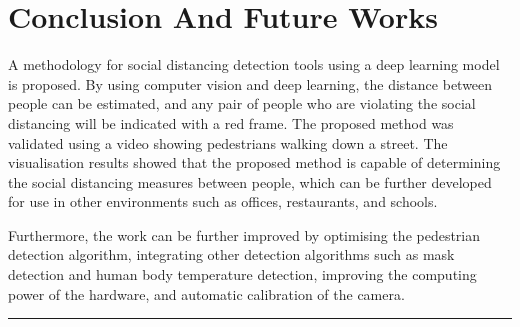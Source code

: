 \documentclass[conference]{IEEEtran}
\begin{document}
\section{Conclusion And Future Works}
A methodology for social distancing detection tools using a deep learning model is proposed. By using computer vision and deep learning, the distance between people can be estimated, and any pair of people who are violating the social distancing will be indicated with a red frame. The proposed method was validated using a video showing pedestrians walking down a street. The visualisation results showed that the proposed method is capable of determining the social distancing measures between people, which can be further developed for use in other environments such as offices, restaurants, and schools.
\par
Furthermore, the work can be further improved by optimising the pedestrian detection algorithm, integrating other detection algorithms such as mask detection and human body temperature detection, improving the computing power of the hardware, and automatic calibration of the camera. 

 


\nocite{*}		

		
\hrule
\vspace{.5in}
\end{document}
